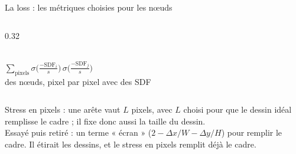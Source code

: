 \documentclass[aspectratio=169,11pt]{beamer}
\begin{document}
\begin{frame}{La loss : les métriques choisies pour les nœuds}
\begin{columns}[T]
\begin{column}{0.32\textwidth}
\\[4pt]
\scriptsize $\displaystyle\sum_{\text{pixels}} \sigma\!\Big(\tfrac{-\mathrm{SDF}_i}{s}\Big)\,\sigma\!\Big(\tfrac{-\mathrm{SDF}_j}{s}\Big)$\\[4pt]
\textcolor{gris}{des nœuds, pixel par pixel avec des SDF}
\end{column}
\end{columns}

\vspace{0.35cm}
\centering\scriptsize\textcolor{gris}{Stress en pixels : une arête vaut $L$ pixels, avec $L$ choisi pour que le dessin idéal remplisse le cadre ; il fixe donc aussi la taille du dessin.}\\
\scriptsize\textcolor{gris}{Essayé puis retiré : un terme « écran » ($2 - \Delta x / W - \Delta y / H$) pour remplir le cadre. Il étirait les dessins, et le stress en pixels remplit déjà le cadre.}
\end{frame}
\end{document}
